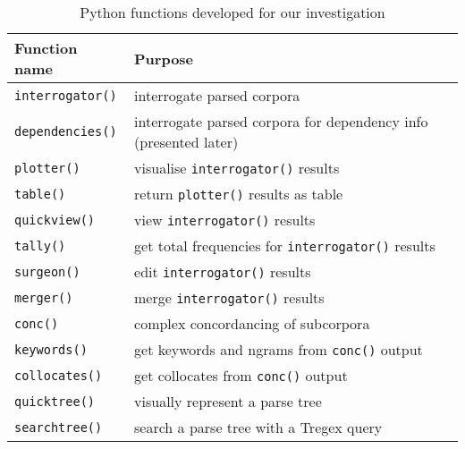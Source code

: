 \begin{table}[h!]
\small
\centering
\begin{tabularx}{0.5\textwidth}{|l|X|} \hline

\textbf{Function name} &  \textbf{Purpose}     \\ \hline
\texttt{interrogator()}  &  interrogate parsed corpora          \\ \hline
\texttt{dependencies()}  &  interrogate parsed corpora for dependency info (presented later)          \\ \hline
\texttt{plotter()}       &  visualise \texttt{interrogator()} results  \\ \hline
\texttt{table()}          &  return \texttt{plotter()} results as table  \\ \hline
\texttt{quickview()}     &  view \texttt{interrogator()} results       \\ \hline
\texttt{tally()}       &  get total frequencies for \texttt{interrogator()} results       \\ \hline
\texttt{surgeon()}       &  edit \texttt{interrogator()} results       \\ \hline
\texttt{merger()}       &  merge \texttt{interrogator()} results       \\ \hline
\texttt{conc()}          &  complex concordancing of subcorpora  \\ \hline
\texttt{keywords()}          &  get keywords and ngrams from \texttt{conc()} output  \\ \hline
\texttt{collocates()}          &  get collocates from \texttt{conc()} output \\ \hline
\texttt{quicktree()}          &  visually represent a parse tree  \\ \hline
\texttt{searchtree()}          &  search a parse tree with a Tregex query  \\ \hline
\end{tabularx}
\caption{Python functions developed for our investigation}
\label{tab:pyfunc}
\end{table}


